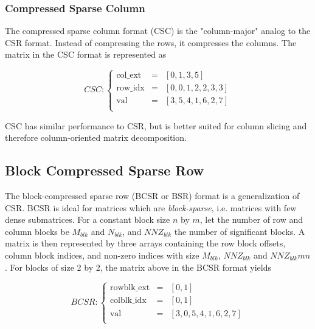 \subsubsection{Compressed Sparse Column}

The compressed sparse column format (CSC) is the "column-major" analog to the CSR format. Instead of compressing the rows, it compresses the columns. The matrix in the CSC format is represented as

\begin{equation*}
CSC: \left\lbrace
\begin{array}{lll}
\textrm{col\_ext} &= &\left[ 0, 1, 3, 5 \right] \\
\textrm{row\_idx} &= &\left[ 0, 0, 1, 2, 2, 3, 3 \right] \\
\textrm{val}  &= &\left[ 3, 5, 4, 1, 6, 2, 7 \right] \\
\end{array}
\right.
\end{equation*}

CSC has similar performance to CSR, but is better suited for column slicing and therefore column-oriented matrix decomposition.

\subsection{Block Compressed Sparse Row}

The block-compressed sparse row (BCSR or BSR) format is a generalization of CSR. BCSR is ideal for matrices which are \emph{block-sparse}, i.e. matrices with few dense submatrices. For a constant block size $n$ by $m$, let the number of row and column blocks be $M_{blk}$ and $N_{blk}$, and $NNZ_{blk}$ the number of significant blocks. A matrix is then represented by three arrays containing the row block offsets, column block indices, and non-zero indices with size $M_{blk}$, $NNZ_{blk}$ and $NNZ_{blk}mn$. For blocks of size 2 by 2, the matrix above in the BCSR format yields

\begin{equation*}
BCSR: \left\lbrace
\begin{array}{lll}
\textrm{rowblk\_ext} &= &\left[ 0, 1 \right] \\
\textrm{colblk\_idx} &= &\left[ 0, 1 \right] \\
\textrm{val}  &= &\left[ 3, 0, 5, 4, 1, 6, 2, 7 \right] \\
\end{array}
\right.
\end{equation*}

